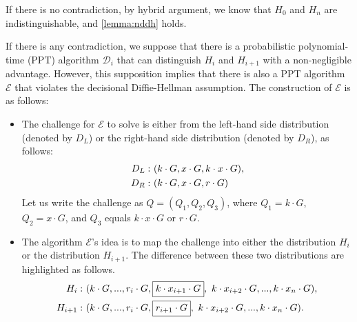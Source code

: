 \documentclass{article}
\begin{document}
If there is no contradiction, by hybrid argument, we know that $H_0$ and $H_n$ are indistinguishable, and \autoref{lemma:nddh} holds.

If there is any contradiction, we suppose that there is a probabilistic polynomial-time (PPT) algorithm $\mathcal{D}_i$ that can distinguish $H_i$ and $H_{i+1}$ with a non-negligible advantage. However, this supposition implies that there is also a PPT algorithm $\mathcal{E}$ that violates the decisional Diffie-Hellman assumption. The construction of $\mathcal{E}$ is as follows:
\begin{itemize}
    \item The challenge for $\mathcal{E}$ to solve is either from the left-hand side distribution (denoted by $D_L$) or the right-hand side distribution (denoted by $D_R$), as follows:
    \begin{align}
        D_L:~&(k\cdot G, x\cdot G, k\cdot x\cdot G),\notag\\
        D_R:~&(k\cdot G, x\cdot G, r\cdot G)\notag
    \end{align}
    Let us write the challenge as $Q=\left(Q_1,Q_2,Q_3\right)$, where $Q_1=k\cdot G$, $Q_2=x\cdot G$, and $Q_3$ equals $k\cdot x\cdot G$ or $r\cdot G$.

    \item The algorithm $\mathcal{E}$'s idea is to map the challenge into either the distribution $H_i$ or the distribution $H_{i+1}$. The difference between these two distributions are highlighted as follows.
    \begin{align}
        H_i:~&(k\cdot G, ..., r_i\cdot G, \boxed{k\cdot x_{i+1}\cdot G},~k\cdot x_{i+2}\cdot G, ..., k\cdot x_n\cdot G),\notag\\
        H_{i+1}:~&(k\cdot G, ..., r_i\cdot G, \boxed{r_{i+1}\cdot G},~k\cdot x_{i+2}\cdot G, ..., k\cdot x_n\cdot G).\notag
    \end{align}
    

\end{itemize}
\end{document}
